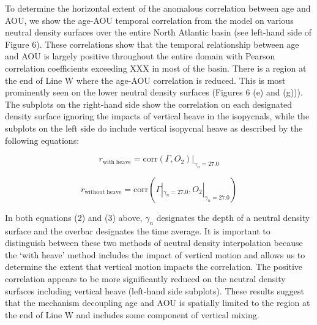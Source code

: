To determine the horizontal extent of the anomalous correlation between age and AOU, we show the age-AOU temporal correlation from the model on various neutral density surfaces over the entire North Atlantic basin (see left-hand side of Figure 6). These correlations show that the temporal relationship between age and AOU is largely positive throughout the entire domain with Pearson correlation coefficients exceeding XXX  in most of the basin. There is a region at the end of Line W where the age-AOU correlation is reduced. This is most prominently seen on the lower neutral density surfaces (Figures 6 (e) and (g))).
The subplots on the right-hand side show the correlation on each designated density surface ignoring the impacts of vertical heave in the isopycnals, while the subplots on the left side do include vertical isopycnal heave as described by the following equations:

\begin{equation}
	r_{\mathrm{with \; heave}} = \mathrm{corr}(\Gamma, O_2)|_{\gamma_n = 27.0}
\end{equation}

\begin{equation}
	r_{\mathrm{without \; heave}} = \mathrm{corr}(\Gamma|_{\gamma_n = 27.0}, O_2|_{\gamma_n = 27.0})
\end{equation}

In both equations (2) and (3) above, $\gamma_n$  designates the depth of a neutral density surface and the overbar designates the time average. It is important to distinguish between these two methods of neutral density interpolation because the `with heave' method includes the impact of vertical motion and allows us to determine the extent that vertical motion impacts the correlation. The positive correlation appears to be more significantly reduced on the neutral density surfaces including vertical heave (left-hand side subplots). These results suggest that the mechanism decoupling age and AOU is spatially limited to the region at the end of Line W and includes some component of vertical mixing.


